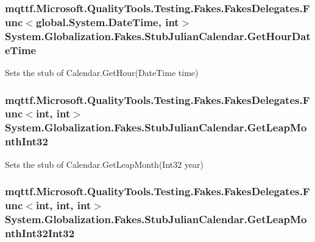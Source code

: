 \hypertarget{class_system_1_1_globalization_1_1_fakes_1_1_stub_julian_calendar_afd719e5918db83f7c6e7767ee9299413}{
\subsubsection[{Get\-Hour\-Date\-Time}]{\setlength{\rightskip}{0pt plus 5cm}mqttf.\-Microsoft.\-Quality\-Tools.\-Testing.\-Fakes.\-Fakes\-Delegates.\-Func$<$global.\-System.\-Date\-Time, int$>$ System.\-Globalization.\-Fakes.\-Stub\-Julian\-Calendar.\-Get\-Hour\-Date\-Time}}\label{class_system_1_1_globalization_1_1_fakes_1_1_stub_julian_calendar_afd719e5918db83f7c6e7767ee9299413}


Sets the stub of Calendar.\-Get\-Hour(\-Date\-Time time)

\hypertarget{class_system_1_1_globalization_1_1_fakes_1_1_stub_julian_calendar_ab45ade40a11e1b0732ffcbbd56eab607}{
\subsubsection[{Get\-Leap\-Month\-Int32}]{\setlength{\rightskip}{0pt plus 5cm}mqttf.\-Microsoft.\-Quality\-Tools.\-Testing.\-Fakes.\-Fakes\-Delegates.\-Func$<$int, int$>$ System.\-Globalization.\-Fakes.\-Stub\-Julian\-Calendar.\-Get\-Leap\-Month\-Int32}}\label{class_system_1_1_globalization_1_1_fakes_1_1_stub_julian_calendar_ab45ade40a11e1b0732ffcbbd56eab607}


Sets the stub of Calendar.\-Get\-Leap\-Month(\-Int32 year)

\hypertarget{class_system_1_1_globalization_1_1_fakes_1_1_stub_julian_calendar_a8ba081edcdbc8c16c74762506d96c001}{
\subsubsection[{Get\-Leap\-Month\-Int32\-Int32}]{\setlength{\rightskip}{0pt plus 5cm}mqttf.\-Microsoft.\-Quality\-Tools.\-Testing.\-Fakes.\-Fakes\-Delegates.\-Func$<$int, int, int$>$ System.\-Globalization.\-Fakes.\-Stub\-Julian\-Calendar.\-Get\-Leap\-Month\-Int32\-Int32}}\label{class_system_1_1_globalization_1_1_fakes_1_1_stub_julian_calendar_a8ba081edcdbc8c16c74762506d96c001}


